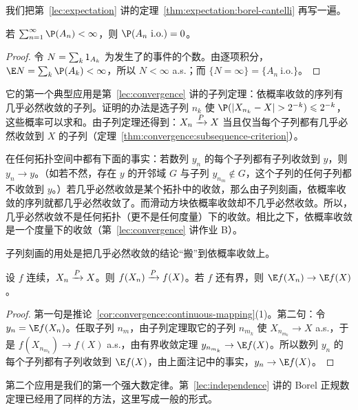 
我们把第~\ref{lec:expectation} 讲的定理~\ref{thm:expectation:borel-cantelli} 再写一遍。

\begin{theorem}\label{thm:borel-cantelli:first}
若 $\sum_{n=1}^\infty \P(A_n)<\infty$，则 $\P(A_n\ \text{i.o.})=0$。
\end{theorem}
\begin{proof}
令 $N=\sum_k1_{A_k}$ 为发生了的事件的个数。由逐项积分，$\E N=\sum_k\P(A_k)<\infty$，所以 $N<\infty$ a.s.；而 $\{N=\infty\}=\{A_n\ \text{i.o.}\}$。
\end{proof}

它的第一个典型应用是第~\ref{lec:convergence} 讲的子列定理：依概率收敛的序列有几乎必然收敛的子列。证明的办法是选子列 $n_k$ 使 $\P(\abs{X_{n_k}-X}>2^{-k})\leqslant2^{-k}$，这些概率可以求和。由子列定理还得到：$X_n\xrightarrow{P} X$ 当且仅当每个子列都有几乎必然收敛到 $X$ 的子列（定理~\ref{thm:convergence:subsequence-criterion}）。

\begin{remark}[几乎必然收敛不来自任何拓扑]
在任何拓扑空间中都有下面的事实：若数列 $y_n$ 的每个子列都有子列收敛到 $y$，则 $y_n\to y$。（如若不然，存在 $y$ 的开邻域 $G$ 与子列 $y_{n_m}\notin G$，这个子列的任何子列都不收敛到 $y$。）若几乎必然收敛是某个拓扑中的收敛，那么由子列刻画，依概率收敛的序列就都几乎必然收敛了。而滑动方块依概率收敛却不几乎必然收敛。所以，几乎必然收敛不是任何拓扑（更不是任何度量）下的收敛。相比之下，依概率收敛是一个度量下的收敛（第~\ref{lec:convergence} 讲作业 B）。
\end{remark}

子列刻画的用处是把几乎必然收敛的结论“搬”到依概率收敛上。

\begin{theorem}\label{thm:borel-cantelli:continuous-mapping}
设 $f$ 连续，$X_n\xrightarrow{P} X$。则 $f(X_n)\xrightarrow{P} f(X)$。若 $f$ 还有界，则 $\E f(X_n)\to \E f(X)$。
\end{theorem}
\begin{proof}
第一句是推论~\ref{cor:convergence:continuous-mapping}(1)。第二句：令 $y_n=\E f(X_n)$。任取子列 $n_m$，由子列定理取它的子列 $n_{m_k}$ 使 $X_{n_{m_k}}\to X$ a.s.，于是 $f(X_{n_{m_k}})\to f(X)$ a.s.，由有界收敛定理 $y_{n_{m_k}}\to \E f(X)$。所以数列 $y_n$ 的每个子列都有子列收敛到 $\E f(X)$，由上面注记中的事实，$y_n\to \E f(X)$。
\end{proof}

第二个应用是我们的第一个强大数定律。第~\ref{lec:independence} 讲的 Borel 正规数定理已经用了同样的方法，这里写成一般的形式。

